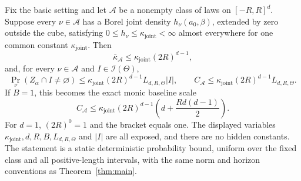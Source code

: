 \begin{corollary}
\label{cor:joint-density-baseline}
Fix the basic setting and let $\mathcal A$ be a nonempty class of laws on
$[-R,R]^d$.  Suppose every $\nu\in\mathcal A$ has a Borel joint density
$h_\nu(a_0,\beta)$, extended by zero outside the cube, satisfying
$0\leq h_\nu\leq\kappa_{\mathrm{joint}}<\infty$ almost everywhere for
one common constant $\kappa_{\mathrm{joint}}$.  Then
\[
\bar\kappa_{\mathcal A}
\leq\kappa_{\mathrm{joint}}(2R)^{d-1},
\]
and, for every $\nu\in\mathcal A$ and
$I\in\mathscr I(\Theta)$,
\[
\Pr_\nu(Z_\alpha\cap I\neq\varnothing)
\leq\kappa_{\mathrm{joint}}(2R)^{d-1}
      L_{d,R,\Theta}|I|,
\qquad
C_{\mathcal A}
\leq\kappa_{\mathrm{joint}}(2R)^{d-1}L_{d,R,\Theta}.
\]
If $B=1$, this becomes the exact monic baseline scale
\[
C_{\mathcal A}
\leq\kappa_{\mathrm{joint}}(2R)^{d-1}
\left(d+\frac{Rd(d-1)}2\right).
\]
For $d=1$, $(2R)^0=1$ and the bracket equals one.  The displayed
variables $\kappa_{\mathrm{joint}},d,R,B,L_{d,R,\Theta}$ and $|I|$ are
all exposed, and there are no hidden constants.  The statement is a
static deterministic probability bound, uniform over the fixed class and
all positive-length intervals, with the same norm and horizon conventions
as Theorem~\ref{thm:main}.
\end{corollary}
